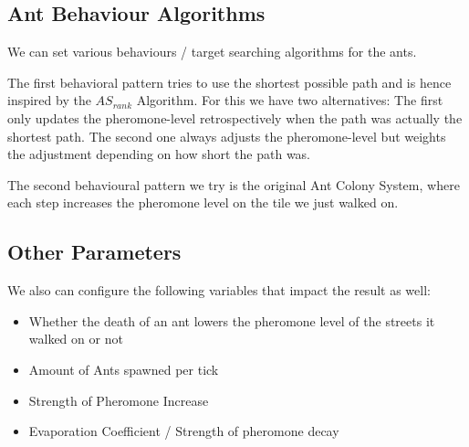 \subsection{Ant Behaviour Algorithms}
We can set various behaviours / target searching algorithms for the ants.

The first behavioral pattern tries to use the shortest possible path and is hence inspired by the $AS_{rank}$ Algorithm\cite{zecchin2007ant}.
For this we have two alternatives: The first only updates the pheromone-level retrospectively when the path was actually the shortest path. The second one always adjusts the pheromone-level but weights the adjustment depending on how short the path was.

The second behavioural pattern we try is the original Ant Colony System\cite{maniezzo2002ant}, where each step increases the pheromone level on the tile we just walked on.

\subsection{Other Parameters}
\label{sec:otherparamas}
We also can configure the following variables that impact the result as well:
\begin{itemize}
\item  Whether the death of an ant lowers the pheromone level of the streets it walked on or not
\item Amount of Ants spawned per tick
\item Strength of Pheromone Increase
\item Evaporation Coefficient / Strength of pheromone decay
\end{itemize}